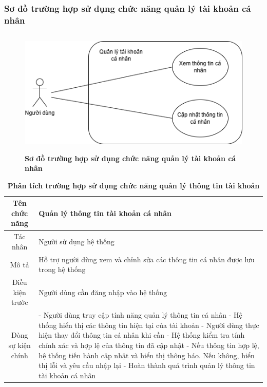 \subsubsection{Sơ đồ trường hợp sử dụng chức năng quản lý tài khoản cá nhân}

\begin{figure}[H]
	\centering
	\includegraphics[width=12cm,height=6cm]{Images/use_case/use_case_account_info.png}
	\caption[Sơ đồ trường hợp sử dụng chức năng quản lý tài khoản cá nhân]{\bfseries \fontsize{12pt}{0pt}
		\selectfont Sơ đồ trường hợp sử dụng chức năng quản lý tài khoản cá nhân}
	\label{use_case_account_info} %
\end{figure}

\begin{table}[H]
	\caption{\bfseries \fontsize{12pt}{0pt}\selectfont Phân tích trường hợp sử dụng chức năng quản lý thông tin tài khoản}
	\centering
	\begin{tabularx}{0.9\textwidth}{|c|X|}
		\hline
		\textbf{Tên chức năng} & \textbf{Quản lý thông tin tài khoản cá nhân}                                     \\
		\hline
		Tác nhân               & Người sử dụng hệ thống                                                           \\
		\hline
		Mô tả                  & Hỗ trợ người dùng xem và chỉnh sửa các thông tin cá nhân được lưu trong hệ thống \\
		\hline
		Điều kiện trước        & Người dùng cần đăng nhập vào hệ thống                                            \\
		\hline
		Dòng sự kiện chính     &
		- Người dùng truy cập tính năng quản lý thông tin cá nhân \newline
		- Hệ thống hiển thị các thông tin hiện tại của tài khoản \newline
		- Người dùng thực hiện thay đổi thông tin cá nhân khi cần \newline
		- Hệ thống kiểm tra tính chính xác và hợp lệ của thông tin đã cập nhật \newline
		- Nếu thông tin hợp lệ, hệ thống tiến hành cập nhật và hiển thị thông báo. Nếu không, hiển thị lỗi và yêu cầu nhập lại \newline
		- Hoàn thành quá trình quản lý thông tin tài khoản cá nhân                                                \\
		\hline
	\end{tabularx}
\end{table}

